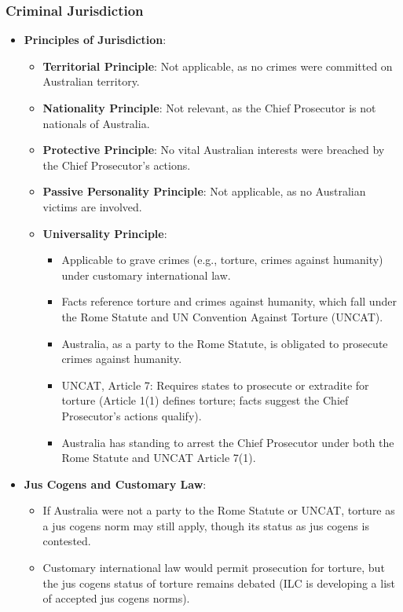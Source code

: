 \subsubsection{Criminal Jurisdiction}
\begin{itemize}
    \item \textbf{Principles of Jurisdiction}:
    \begin{itemize}
        \item \textbf{Territorial Principle}: Not applicable, as no crimes were committed on Australian territory.
        \item \textbf{Nationality Principle}: Not relevant, as the Chief Prosecutor is not nationals of Australia.
        \item \textbf{Protective Principle}: No vital Australian interests were breached by the Chief Prosecutor’s actions.
        \item \textbf{Passive Personality Principle}: Not applicable, as no Australian victims are involved.
        \item \textbf{Universality Principle}:
        \begin{itemize}
            \item Applicable to grave crimes (e.g., torture, crimes against humanity) under customary international law.
            \item Facts reference torture and crimes against humanity, which fall under the Rome Statute and UN Convention Against Torture (UNCAT).
            \item Australia, as a party to the Rome Statute, is obligated to prosecute crimes against humanity.
            \item UNCAT, Article 7: Requires states to prosecute or extradite for torture (Article 1(1) defines torture; facts suggest the Chief Prosecutor’s actions qualify).
            \item Australia has standing to arrest the Chief Prosecutor under both the Rome Statute and UNCAT Article 7(1).
        \end{itemize}
    \end{itemize}
    \item \textbf{Jus Cogens and Customary Law}:
    \begin{itemize}
        \item If Australia were not a party to the Rome Statute or UNCAT, torture as a jus cogens norm may still apply, though its status as jus cogens is contested.
        \item Customary international law would permit prosecution for torture, but the jus cogens status of torture remains debated (ILC is developing a list of accepted jus cogens norms).

\end{itemize}
\end{itemize}
